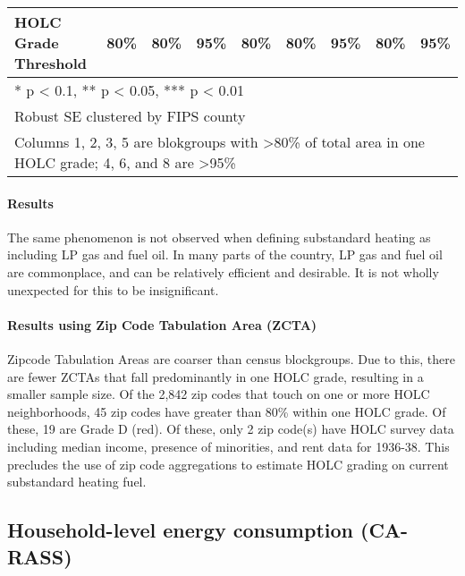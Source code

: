 \documentclass[
]{article}
\begin{document}
\begin{table}
{\begin{tabular}[t]{lcccccccc}
HOLC Grade Threshold & 80\% & 80\% & 95\% & 80\% & 80\% & 95\% & 80\% & 95\%\\
\bottomrule
\multicolumn{9}{l}{\textsuperscript{} * p < 0.1, ** p < 0.05, *** p < 0.01}\\
\multicolumn{9}{l}{\textsuperscript{} Robust SE clustered by FIPS county}\\
\multicolumn{9}{l}{\textsuperscript{} Columns 1, 2, 3, 5 are blokgroups with >80\% of total area in one HOLC grade; 4, 6, and 8 are >95\%}\\
\end{tabular}}
\end{table}

\hypertarget{results-1}{%
\paragraph{Results}\label{results-1}}

The same phenomenon is not observed when defining substandard heating as
including LP gas and fuel oil. In many parts of the country, LP gas and
fuel oil are commonplace, and can be relatively efficient and desirable.
It is not wholly unexpected for this to be insignificant.

\hypertarget{results-using-zip-code-tabulation-area-zcta}{%
\paragraph{Results using Zip Code Tabulation Area
(ZCTA)}\label{results-using-zip-code-tabulation-area-zcta}}

Zipcode Tabulation Areas are coarser than census blockgroups. Due to
this, there are fewer ZCTAs that fall predominantly in one HOLC grade,
resulting in a smaller sample size. Of the 2,842 zip codes that touch on
one or more HOLC neighborhoods, 45 zip codes have greater than 80\%
within one HOLC grade. Of these, 19 are Grade D (red). Of these, only 2
zip code(s) have HOLC survey data including median income, presence of
minorities, and rent data for 1936-38. This precludes the use of zip
code aggregations to estimate HOLC grading on current substandard
heating fuel.

\hypertarget{household-level-energy-consumption-ca-rass}{%
\subsection{Household-level energy consumption
(CA-RASS)}\label{household-level-energy-consumption-ca-rass}}
\end{document}
